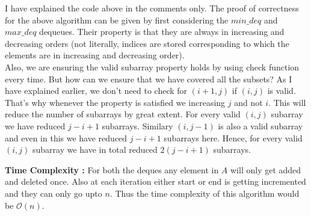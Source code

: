 \documentclass[14pt]{article}
\begin{document}
    	I have explained the code above in the comments only. The proof of correctness for the above algorithm can be given by first considering the $min\_deq$ and $max\_deq$ dequeues. Their property is that they are always in increasing and decreasing orders (not literally, indices are stored corresponding to which the elements are in increasing and decreasing order). \\
    	Also, we are ensuring the valid subarray property holds by using check function every time. But how can we ensure that we have covered all the subsets? As I have explained earlier, we don't need to check for $(i+1, j)$ if $(i, j)$ is valid. That's why whenever the property is satisfied we increasing $j$ and not $i$. This will reduce the number of subarrays by great extent. For every valid $(i, j)$ subarray we have reduced $j-i+1$ subarrays. Similary $(i, j-1)$ is also a valid subarray and even in this we have reduced $j-i+1$ subarrays here. Hence, for every valid $(i, j)$ subarray we have in total reduced $2(j-i+1)$ subarrays. 
		
		\textbf{Time Complexity : }For both the deques any element in $A$ will only get added and deleted once. Also at each iteration either start or end is getting incremented and they can only go upto $n$. Thus the time complexity of this algorithm would be $\mathcal{O}(n)$. 
		
\end{document}
